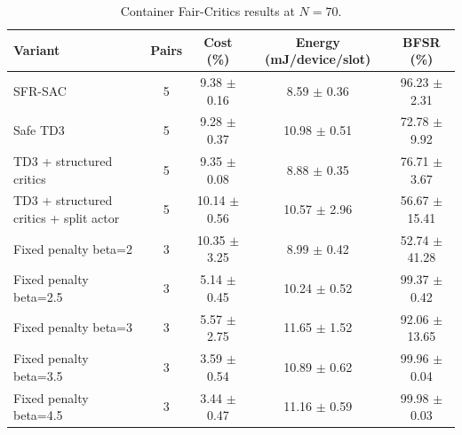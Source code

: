 \begin{table}[t]
\centering
\caption{Container Fair-Critics results at $N=70$.}
\label{tab:container_fair_critics}
\footnotesize
\begin{tabular}{lcccc}
\hline
Variant & Pairs & Cost (\%) & Energy (mJ/device/slot) & BFSR (\%) \\
\hline
SFR-SAC & 5 & 9.38 $\pm$ 0.16 & 8.59 $\pm$ 0.36 & 96.23 $\pm$ 2.31 \\
Safe TD3 & 5 & 9.28 $\pm$ 0.37 & 10.98 $\pm$ 0.51 & 72.78 $\pm$ 9.92 \\
TD3 + structured critics & 5 & 9.35 $\pm$ 0.08 & 8.88 $\pm$ 0.35 & 76.71 $\pm$ 3.67 \\
TD3 + structured critics + split actor & 5 & 10.14 $\pm$ 0.56 & 10.57 $\pm$ 2.96 & 56.67 $\pm$ 15.41 \\
Fixed penalty beta=2 & 3 & 10.35 $\pm$ 3.25 & 8.99 $\pm$ 0.42 & 52.74 $\pm$ 41.28 \\
Fixed penalty beta=2.5 & 3 & 5.14 $\pm$ 0.45 & 10.24 $\pm$ 0.52 & 99.37 $\pm$ 0.42 \\
Fixed penalty beta=3 & 3 & 5.57 $\pm$ 2.75 & 11.65 $\pm$ 1.52 & 92.06 $\pm$ 13.65 \\
Fixed penalty beta=3.5 & 3 & 3.59 $\pm$ 0.54 & 10.89 $\pm$ 0.62 & 99.96 $\pm$ 0.04 \\
Fixed penalty beta=4.5 & 3 & 3.44 $\pm$ 0.47 & 11.16 $\pm$ 0.59 & 99.98 $\pm$ 0.03 \\
\hline
\end{tabular}
\end{table}
